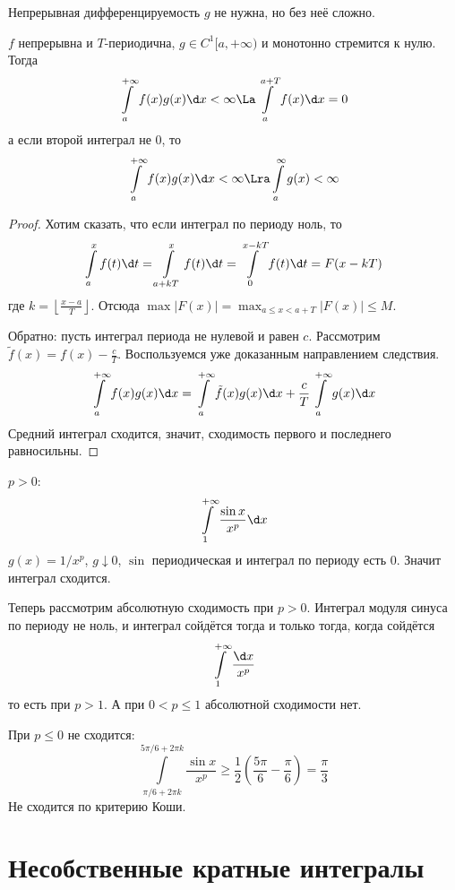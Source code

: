 \begin{Rem}
	Непрерывная дифференцируемость $g$ не нужна, но без неё сложно.
\end{Rem}

\begin{conseq}
	$f$ непрерывна и $T$-периодична, $g \in C^1[a, +\infty)$ и монотонно стремится к нулю.
	Тогда
	\[ \int\limits_a^{+\infty} f(x) g(x) \d x < \infty \La \int\limits_a^{a+T} f(x) \d x = 0 \]
	а если второй интеграл не 0, то
	\[ \int\limits_a^{+\infty} f(x) g(x) \d x < \infty \Lra \int\limits_a^{\infty} g(x) < \infty \]
\end{conseq}

\begin{proof}
	Хотим сказать, что если интеграл по периоду ноль, то
	\[ \int\limits_a^x f(t) \d t = \int\limits_{a+kT}^x f(t) \d t = \int\limits_0^{x-kT} f(t) \d t = F(x - kT) \]
	где $k = \left\lfloor \frac{x - a}T \right\rfloor$.
	Отсюда $\max |F(x)| = \max_{a \le x < a + T} |F(x)| \le M$.

	Обратно: пусть интеграл периода не нулевой и равен $c$.
	Рассмотрим $\tilde f(x) = f(x) - \frac{c}T$.
	Воспользуемся уже доказанным направлением следствия.
	\[ \int\limits_a^{+\infty} f(x) g(x) \d x = \int\limits_a^{+\infty} \tilde f(x) g(x) \d x + \frac{c}T \int\limits_a^{+\infty} g(x) \d x \]
	Средний интеграл сходится, значит, сходимость первого и последнего равносильны.
\end{proof}

\begin{exmp}\label{exmpIntFracSin}
	$p > 0$:
	\[ \int\limits_1^{+\infty} \frac{\sin x}{x^p} \d x \]
	$g(x) = 1 / x^p$, $g \downarrow 0$, $\sin$ периодическая и интеграл по периоду есть 0.
	Значит интеграл сходится.

	Теперь рассмотрим абсолютную сходимость при $p>0$.
	Интеграл модуля синуса по периоду не ноль, и интеграл сойдётся тогда и только тогда, когда сойдётся
	\[ \int\limits_1^{+\infty} \frac{\d x}{x^p} \]
	то есть при $p > 1$.
	А при $0 < p \le 1$ абсолютной сходимости нет.

	При $p \le 0$ не сходится:
	\[ \int\limits_{\pi/6+2\pi k}^{5 \pi/6 + 2\pi k} \frac{\sin x}{x^p} \ge \frac12 \left(\frac{5\pi}6 - \frac\pi6\right) = \frac\pi3 \]
	Не сходится по критерию Коши.
\end{exmp}

\section{Несобственные кратные интегралы}

